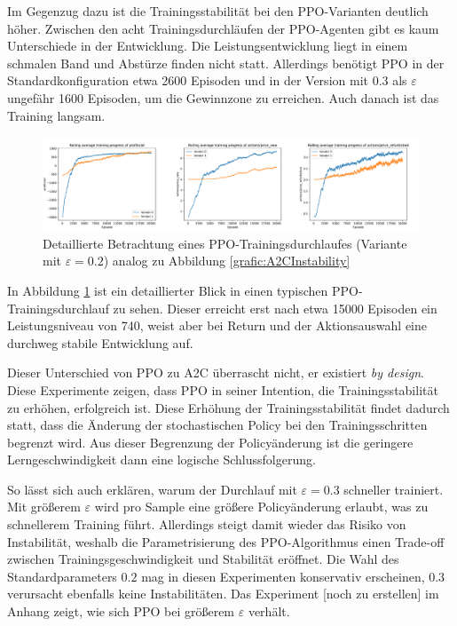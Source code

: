Im Gegenzug dazu ist die Trainingsstabilität bei den PPO-Varianten deutlich höher.
Zwischen den acht Trainingsdurchläufen der PPO-Agenten gibt es kaum Unterschiede in der Entwicklung.
Die Leistungsentwicklung liegt in einem schmalen Band und Abstürze finden nicht statt.
Allerdings benötigt PPO in der Standardkonfiguration etwa 2600 Episoden und in der Version mit $0.3$ als $\varepsilon$ ungefähr 1600 Episoden, um die Gewinnzone zu erreichen.
Auch danach ist das Training langsam.
\begin{figure}[htbp]
	\centering
	\includegraphics[width=\textwidth]{main/ppo_detailed_analysis.pdf}
	\caption{Detaillierte Betrachtung eines PPO-Trainingsdurchlaufes (Variante mit $\varepsilon=0.2$) analog zu Abbildung \ref{grafic:A2CInstability}}
	\label{grafic:PPOStability}
\end{figure}
In Abbildung \ref{grafic:PPOStability} ist ein detaillierter Blick in einen typischen PPO-Trainingsdurchlauf zu sehen.
Dieser erreicht erst nach etwa 15000 Episoden ein Leistungsniveau von 740, weist aber bei Return und der Aktionsauswahl eine durchweg stabile Entwicklung auf.

Dieser Unterschied von PPO zu A2C überrascht nicht, er existiert \textit{by design}.
Diese Experimente zeigen, dass PPO in seiner Intention, die Trainingsstabilität zu erhöhen, erfolgreich ist.
Diese Erhöhung der Trainingsstabilität findet dadurch statt, dass die Änderung der stochastischen Policy bei den Trainingsschritten begrenzt wird.
Aus dieser Begrenzung der Policyänderung ist die geringere Lerngeschwindigkeit dann eine logische Schlussfolgerung.

So lässt sich auch erklären, warum der Durchlauf mit $\varepsilon=0.3$ schneller trainiert.
Mit größerem $\varepsilon$ wird pro Sample eine größere Policyänderung erlaubt, was zu schnellerem Training führt.
Allerdings steigt damit wieder das Risiko von Instabilität, weshalb die Parametrisierung des PPO-Algorithmus einen Trade-off zwischen Trainingsgeschwindigkeit und Stabilität eröffnet.
Die Wahl des Standardparameters $0.2$ mag in diesen Experimenten konservativ erscheinen, $0.3$ verursacht ebenfalls keine Instabilitäten.
Das Experiment [noch zu erstellen] im Anhang zeigt, wie sich PPO bei größerem $\varepsilon$ verhält.

